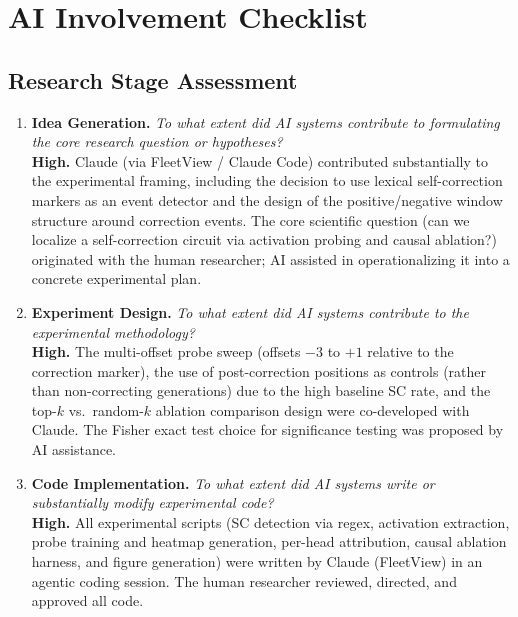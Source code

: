 
\section*{AI Involvement Checklist}

\subsection*{Research Stage Assessment}

\begin{enumerate}

\item \textbf{Idea Generation.}
\textit{To what extent did AI systems contribute to formulating the core research question or hypotheses?} \\
\textbf{High.} Claude (via FleetView / Claude Code) contributed substantially to the experimental framing, including the decision to use lexical self-correction markers as an event detector and the design of the positive/negative window structure around correction events. The core scientific question (can we localize a self-correction circuit via activation probing and causal ablation?) originated with the human researcher; AI assisted in operationalizing it into a concrete experimental plan.

\item \textbf{Experiment Design.}
\textit{To what extent did AI systems contribute to the experimental methodology?} \\
\textbf{High.} The multi-offset probe sweep (offsets $-3$ to $+1$ relative to the correction marker), the use of post-correction positions as controls (rather than non-correcting generations) due to the high baseline SC rate, and the top-$k$ vs.\ random-$k$ ablation comparison design were co-developed with Claude. The Fisher exact test choice for significance testing was proposed by AI assistance.

\item \textbf{Code Implementation.}
\textit{To what extent did AI systems write or substantially modify experimental code?} \\
\textbf{High.} All experimental scripts (SC detection via regex, activation extraction, probe training and heatmap generation, per-head attribution, causal ablation harness, and figure generation) were written by Claude (FleetView) in an agentic coding session. The human researcher reviewed, directed, and approved all code.


\end{enumerate}
